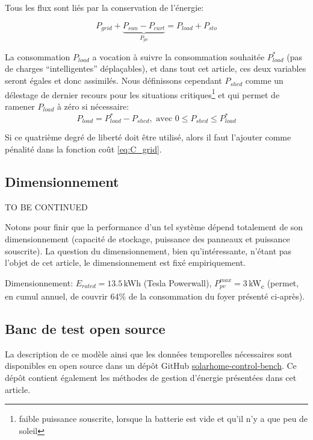\documentclass[a4paper,10pt,twocolumn]{article}
\begin{document}
Tous les flux sont liés par la conservation de l'énergie:

\begin{equation}
  P_{grid} + \underbrace{P_{sun} - P_{curt}}_{P_{pv}} = P_{load} + P_{sto}
\end{equation}

La consommation $P_{load}$ a vocation à suivre la consommation souhaitée $P_{load}^*$
(pas de charges ``intelligentes'' déplaçables), et dans tout cet article, ces deux
variables seront égales et donc assimilés.
Nous définissons cependant $P_{shed}$ comme un délestage de dernier
recours pour les situations critiques\footnote{faible puissance souscrite, lorsque
la batterie est vide et qu'il n'y a que peu de soleil} et qui permet
de ramener $P_{load}$ à zéro si nécessaire:
%
\begin{equation}
  P_{load} = P_{load}^* - P_{shed}, \text{ avec } 0 \leq P_{shed} \leq P_{load}^*
\end{equation}

Si ce quatrième degré de liberté doit être utilisé,
alors il faut l'ajouter comme pénalité dans la fonction coût \eqref{eq:C_grid}.

\subsection{Dimensionnement}

TO BE CONTINUED

Notons pour finir que la performance d'un tel système dépend totalement de son dimensionnement
(capacité de stockage, puissance des panneaux et  puissance souscrite).
La question du dimensionnement, bien qu'intéressante, n'étant pas l'objet de cet article,
le dimensionnement est fixé empiriquement.

Dimensionnement: $E_{rated}=13.5\,$kWh (Tesla Powerwall), $P_{pv}^{max}=3\,$kW\textsubscript{c} (permet, en cumul annuel, de couvrir 64\% de la consommation du foyer présenté ci-après).

\subsection{Banc de test open source}

La description de ce modèle ainsi que les données temporelles nécessaires sont
disponibles en open source dans un dépôt GitHub \href{https://github.com/pierre-haessig/solarhome-control-bench}{solarhome-control-bench}.
Ce dépôt contient également les méthodes de gestion d'énergie présentées dans cet article.
\end{document}
